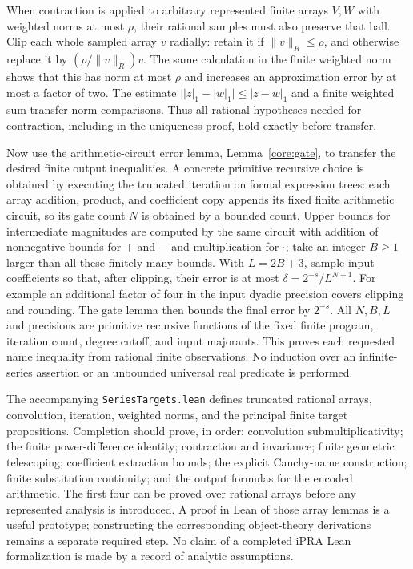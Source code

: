 When contraction is applied to arbitrary represented finite arrays
$V,W$ with weighted norms at most $\rho$, their rational samples must
also preserve that ball.  Clip each whole sampled array $v$ radially:
retain it if $\lVert v\rVert_R\le\rho$, and otherwise replace it by
$(\rho/\lVert v\rVert_R)v$.  The same calculation in the finite weighted
norm shows that this has norm at most $\rho$ and increases an approximation
error by at most a factor of two.  The estimate
$\bigl||z|_1-|w|_1\bigr|\le|z-w|_1$ and a finite weighted sum transfer
norm comparisons.  Thus all rational hypotheses needed for contraction,
including in the uniqueness proof, hold exactly before transfer.

Now use the arithmetic-circuit error lemma, Lemma~\ref{core:gate}, to
transfer the desired finite output inequalities.  A concrete primitive
recursive choice is obtained by executing the truncated iteration on
formal expression trees: each array addition, product, and coefficient
copy appends its fixed finite arithmetic circuit, so its gate count $N$
is obtained by a bounded count.  Upper bounds for intermediate magnitudes
are computed by the same circuit with addition of nonnegative bounds for
$+$ and $-$ and multiplication for $\cdot$; take an integer $B\ge1$
larger than all these finitely many bounds.  With $L=2B+3$, sample input
coefficients so that, after clipping, their error is at most
$\delta=2^{-s}/L^{N+1}$.  For example an additional factor of four in the
input dyadic precision covers clipping and rounding.  The gate lemma then
bounds the final error by $2^{-s}$.  All $N,B,L$ and precisions are
primitive recursive functions of the fixed finite program, iteration
count, degree cutoff, and input majorants.  This proves each requested
name inequality from rational finite observations.  No induction over
an infinite-series assertion or an unbounded universal real predicate is
performed.

The accompanying \texttt{SeriesTargets.lean} defines truncated rational
arrays, convolution, iteration, weighted norms, and the principal finite
target propositions.  Completion should prove, in order: convolution
submultiplicativity; the finite power-difference identity; contraction and
invariance; finite geometric telescoping; coefficient extraction bounds;
the explicit Cauchy-name construction; finite substitution continuity;
and the output formulas for the encoded arithmetic.
The first four can be proved over rational arrays before any represented
analysis is introduced.  A proof in Lean of those array lemmas is a useful
prototype; constructing the corresponding object-theory derivations
remains a separate required step.  No claim of a completed iPRA Lean
formalization is made by a record of analytic assumptions.
